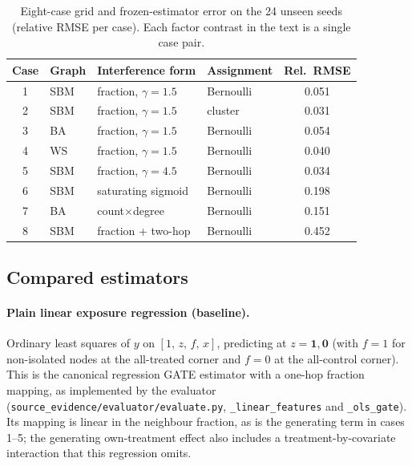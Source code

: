 \documentclass{article}
\begin{document}
\begin{table}[t]
\centering\small
\caption{Eight-case grid and frozen-estimator error on the 24 unseen seeds (relative RMSE per case). Each factor contrast in the text is a single case pair.}
\label{tab:cases}
\begin{tabular}{clllc}
\toprule
Case & Graph & Interference form & Assignment & Rel.\ RMSE\\
\midrule
1 & SBM & fraction, $\gamma=1.5$ & Bernoulli & 0.051\\ %
2 & SBM & fraction, $\gamma=1.5$ & cluster & 0.031\\ %
3 & BA & fraction, $\gamma=1.5$ & Bernoulli & 0.054\\ %
4 & WS & fraction, $\gamma=1.5$ & Bernoulli & 0.040\\ %
5 & SBM & fraction, $\gamma=4.5$ & Bernoulli & 0.034\\ %
6 & SBM & saturating sigmoid & Bernoulli & 0.198\\ %
7 & BA & count$\times$degree & Bernoulli & 0.151\\ %
8 & SBM & fraction + two-hop & Bernoulli & 0.452\\ %
\bottomrule
\end{tabular}
\end{table}

\subsection{Compared estimators}
\paragraph{Plain linear exposure regression (baseline).} Ordinary least squares of $y$ on $[1,\,z,\,f,\,x]$, predicting at $z=\mathbf 1,\mathbf 0$ (with $f=1$ for non-isolated nodes at the all-treated corner and $f=0$ at the all-control corner). This is the canonical regression GATE estimator \citep{Chin2018RegressionAF} with a one-hop fraction mapping, as implemented by the evaluator (\texttt{source\_evidence/evaluator/evaluate.py}, \texttt{\_linear\_features} and \texttt{\_ols\_gate}). Its mapping is linear in the neighbour fraction, as is the generating term in cases 1--5; the generating own-treatment effect also includes a treatment-by-covariate interaction that this regression omits.
\end{document}
